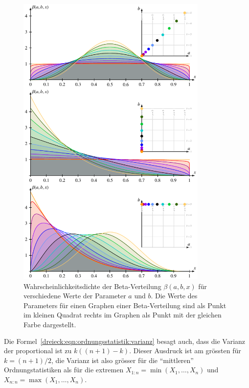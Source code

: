 \begin{figure}
\centering
\includegraphics[width=0.84\textwidth]{papers/dreieck/images/beta.pdf}
\caption{Wahrscheinlichkeitsdichte der Beta-Verteilung
$\beta(a,b,x)$
für verschiedene Werte der Parameter $a$ und $b$.
Die Werte des Parameters für einen Graphen einer Beta-Verteilung
sind als Punkt im kleinen Quadrat rechts
im Graphen als Punkt mit der gleichen Farbe dargestellt.
\label{dreieck:fig:betaverteilungn}}
\end{figure}

Die Formel~\eqref{dreieck:eqn:ordnungsstatistik:varianz}
besagt auch, dass die Varianz der proportional ist zu $k((n+1)-k)$.
Dieser Ausdruck ist am grössten für $k=(n+1)/2$, die Varianz ist
also grösser für die ``mittleren'' Ordnungstatistiken als für die
extremen $X_{1:n}=\operatorname{min}(X_1,\dots,X_n)$ und
$X_{n:n}=\operatorname{max}(X_1,\dots,X_n)$.


